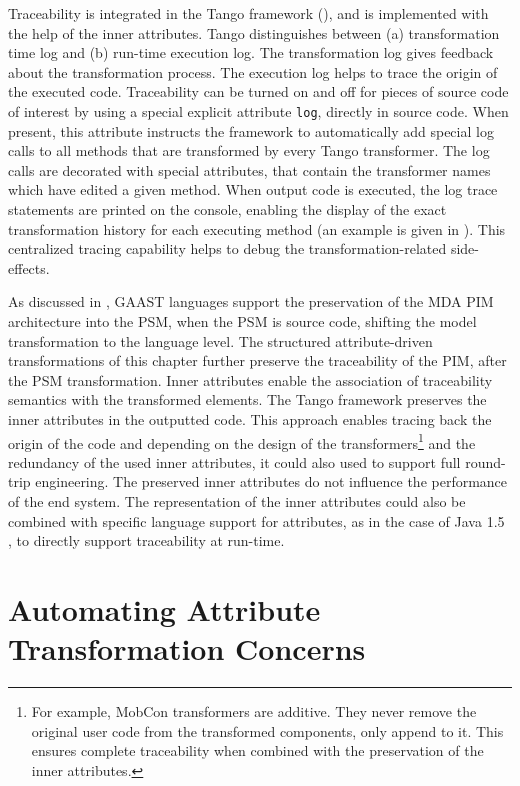 Traceability is integrated in the Tango framework (), and is implemented with the help of the inner attributes. Tango distinguishes between (a) transformation time log and (b) run-time execution log. The transformation log gives feedback about the transformation process. The execution log helps to trace the origin of the executed code. Traceability can be turned on and off for pieces of source code of interest by using a special explicit attribute \texttt{log}, directly in source code. When present, this attribute instructs the framework to automatically add special log calls to all methods that are transformed by every Tango transformer. The log calls are decorated with special attributes, that contain the transformer names which have edited a given method. When output code is executed, the log trace statements are printed on the console, enabling the display of the exact transformation history for each executing method (an example is given in ). This centralized tracing capability helps to debug the transformation-related side-effects.

As discussed in , GAAST languages support the preservation of the MDA PIM architecture into the PSM, when the PSM is source code, shifting the model transformation to the language level. The structured attribute-driven transformations of this chapter further preserve the traceability of the PIM, after the PSM transformation. Inner attributes  enable the association of traceability semantics with the transformed elements. The Tango framework preserves the inner attributes in the outputted code. This approach enables tracing back the origin of the code and depending on the design of the transformers\footnote{For example, MobCon  transformers are additive. They never remove the original user code from the transformed components, only append to it. This ensures complete traceability when combined with the preservation of the inner attributes.} and the redundancy of the used inner attributes, it could also used to support full round-trip engineering. The preserved inner attributes do not influence the performance of the end system. The representation of the inner attributes could also be combined with specific language support for attributes, as in the case of Java 1.5 , to directly support traceability at run-time.


\section{Automating Attribute Transformation Concerns}
\label{ch04:sec:dep}

